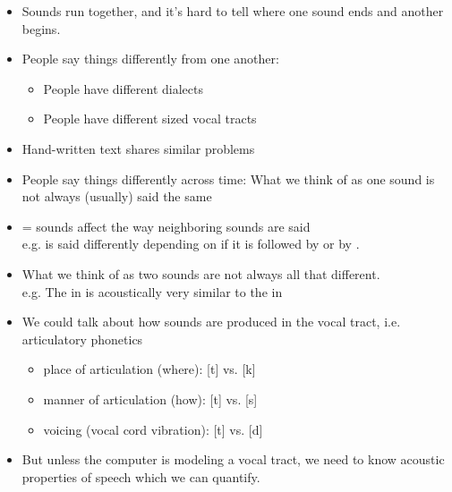 \documentclass[a4paper,landscape,headrule,footrule,xetex]{foils}
\begin{document}
\begin{itemize}
\item Sounds run together, and it's hard to tell where one sound ends and another begins.
\item People say things differently from one another: 
  \begin{itemize}
  \item People have different dialects
  \item People have different sized vocal tracts 
  \end{itemize}
\item Hand-written text shares similar problems
\newpage
\item People say things differently across time: What we think of as one sound is not always (usually) said the same
\item {} = sounds affect the way neighboring sounds are said
\\e.g.  is said differently depending on if it is followed by  or by .

\item What we think of as two sounds are not always all that different.
\\ e.g. The  in  is acoustically very similar to the  in 
\end{itemize}






\begin{itemize}
\item We could talk about how sounds are produced in the vocal tract, i.e. articulatory phonetics
\begin{itemize}
\item place of articulation (where): [t] vs. [k]
\item manner of articulation (how): [t] vs. [s]
\item voicing (vocal cord vibration): [t] vs. [d]
\end{itemize}
\item But unless the computer is modeling a vocal tract, we need to know acoustic properties of speech which we can quantify.
\end{itemize}





\end{document}
